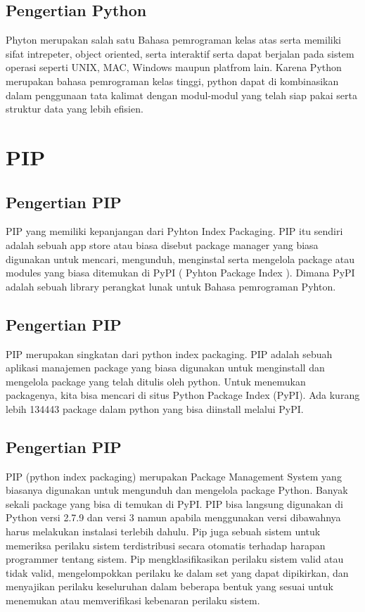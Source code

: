 \documentclass[12pt,a4paper]{article}
\begin{document}
\subsection{Pengertian Python}
Phyton merupakan salah satu Bahasa pemrograman kelas atas serta memiliki sifat intrepeter, object oriented, serta interaktif serta dapat berjalan pada sistem operasi seperti UNIX, MAC, Windows maupun platfrom lain. Karena Python merupakan bahasa pemrograman kelas tinggi, python dapat di kombinasikan dalam penggunaan tata kalimat dengan modul-modul yang telah siap pakai serta struktur data yang lebih efisien.

\section{PIP}
\subsection{Pengertian PIP}
PIP yang memiliki kepanjangan dari Pyhton Index Packaging. PIP itu sendiri adalah sebuah app store atau biasa disebut package manager yang biasa digunakan untuk mencari, mengunduh, menginstal serta mengelola package atau modules yang biasa ditemukan di PyPI ( Pyhton Package Index ). Dimana PyPI adalah sebuah library perangkat lunak untuk Bahasa pemrograman Pyhton.
\subsection{Pengertian PIP}
PIP merupakan singkatan dari python index packaging. PIP adalah sebuah aplikasi manajemen package yang biasa digunakan untuk menginstall dan mengelola package yang telah ditulis oleh python. Untuk menemukan packagenya, kita bisa mencari di situs Python Package Index (PyPI). Ada kurang lebih 134443 package dalam python yang bisa diinstall melalui PyPI.
\subsection{Pengertian PIP}
PIP (python index packaging) merupakan Package Management System yang biasanya digunakan untuk mengunduh dan mengelola package Python. Banyak sekali package yang bisa di temukan di PyPI. 
PIP bisa langsung digunakan di Python versi 2.7.9 dan versi 3 namun apabila menggunakan versi dibawahnya harus melakukan instalasi terlebih dahulu. 
Pip juga sebuah sistem untuk memeriksa perilaku sistem terdistribusi secara otomatis terhadap harapan programmer tentang sistem. Pip mengklasifikasikan perilaku sistem valid atau tidak valid, mengelompokkan perilaku ke dalam set yang dapat dipikirkan, dan menyajikan perilaku keseluruhan dalam beberapa bentuk yang sesuai untuk menemukan atau memverifikasi kebenaran perilaku sistem.
\end{document}
